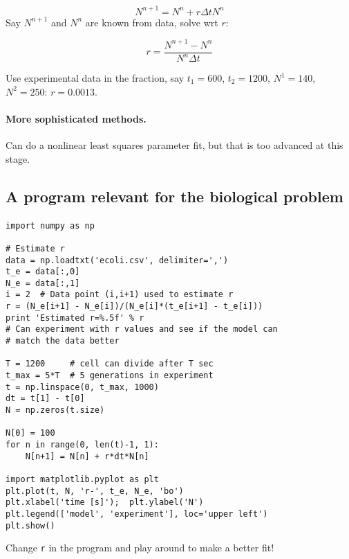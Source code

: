 \documentclass[%
twoside,                 %
final,                   %
10pt]{article}
\begin{document}
\[ N^{n+1} = N^n + r\Delta t N^n\]
Say $N^{n+1}$ and $N^n$ are known from data, solve wrt $r$:

\[ r = \frac{N^{n+1}-N^n}{N^n\Delta t} \]

Use experimental data in the fraction, say $t_1=600$, $t_2=1200$,
$N^1=140$, $N^2=250$: $r=0.0013$.




\paragraph{More sophisticated methods.}
Can do a nonlinear least squares parameter fit, but that is
too advanced at this stage.



\subsection*{A program relevant for the biological problem}



\paragraph{}
\begin{verbatim}
import numpy as np

# Estimate r
data = np.loadtxt('ecoli.csv', delimiter=',')
t_e = data[:,0]
N_e = data[:,1]
i = 2  # Data point (i,i+1) used to estimate r
r = (N_e[i+1] - N_e[i])/(N_e[i]*(t_e[i+1] - t_e[i]))
print 'Estimated r=%.5f' % r
# Can experiment with r values and see if the model can
# match the data better

T = 1200     # cell can divide after T sec
t_max = 5*T  # 5 generations in experiment
t = np.linspace(0, t_max, 1000)
dt = t[1] - t[0]
N = np.zeros(t.size)

N[0] = 100
for n in range(0, len(t)-1, 1):
    N[n+1] = N[n] + r*dt*N[n]

import matplotlib.pyplot as plt
plt.plot(t, N, 'r-', t_e, N_e, 'bo')
plt.xlabel('time [s]');  plt.ylabel('N')
plt.legend(['model', 'experiment'], loc='upper left')
plt.show()
\end{verbatim}

Change \Verb!r! in the program and play around to make a better fit!
\end{document}
